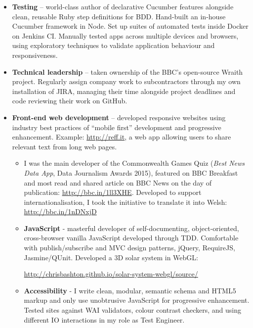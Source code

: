 \documentclass[class=article, crop=false]{standalone}
\begin{document}
\begin{itemize}
    \setlength\itemsep{0.3em}

    \item \textbf{Testing} – world-class author of declarative Cucumber features alongside clean, reusable Ruby step definitions for BDD. Hand-built an in-house Cucumber framework in Node. Set up suites of automated tests inside Docker on Jenkins CI. Manually tested apps across multiple devices and browsers, using exploratory techniques to validate application behaviour and responsiveness.

    \item \textbf{Technical leadership} – taken ownership of the BBC's open-source Wraith project. Regularly assign company work to subcontractors through my own installation of JIRA, managing their time alongside project deadlines and code reviewing their work on GitHub.

    \item \textbf{Front-end web development} – developed responsive websites using industry best practices of ``mobile first'' development and progressive enhancement. Example: \url{http://reff.it}, a web app allowing users to share relevant text from long web pages.

    \begin{itemize}
        \setlength\itemsep{0.3em}

        \item I was the main developer of the Commonwealth Games Quiz (\emph{Best News Data App}, Data Journalism Awards 2015), featured on BBC Breakfast and most read and shared article on BBC News on the day of publication: \url{http://bbc.in/1ll3XHE}. Developed to support internationalisation, I took the initiative to translate it into Welsh: \url{http://bbc.in/1nDNxjD}

        \item \textbf{JavaScript} - masterful developer of self-documenting, object-oriented, cross-browser vanilla JavaScript developed through TDD. Comfortable with publish/subscribe and MVC design patterns, jQuery, RequireJS, Jasmine/QUnit. Developed a 3D solar system in WebGL:

        \url{http://chrisbashton.github.io/solar-system-webgl/source/}

        \item \textbf{Accessibility} - I write clean, modular, semantic schema and HTML5 markup and only use unobtrusive JavaScript for progressive enhancement. Tested sites against WAI validators, colour contrast checkers, and using different IO interactions in my role as Test Engineer.


\end{itemize}
\end{itemize}
\end{document}
